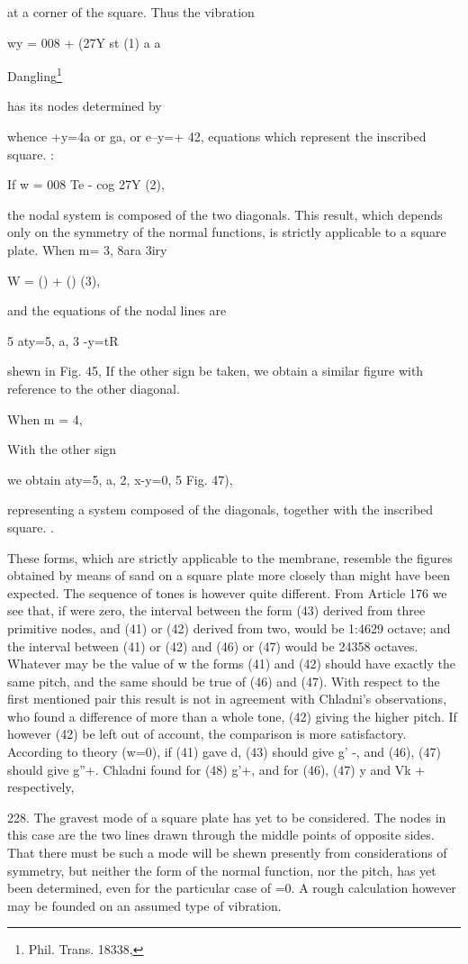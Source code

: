 at a corner of the square. Thus the vibration

wy = 008 + (27Y st (1) a a

Dangling\footnote{ Phil. Trans. 18338,}

has its nodes determined by

whence +y=4a or ga, or e--y=+ 42, equations which represent the
inscribed square. :

If w = 008 Te - cog 27Y (2),

the nodal system is composed of the two diagonals. This result, which
depends only on the symmetry of the normal functions, is strictly
applicable to a square plate. When m= 3, 8ara 3iry

W = () + () (3),

and the equations of the nodal lines are

5 aty=5, a, 3 -y=tR

shewn in Fig. 45, If the other sign be taken, we obtain a similar figure
with reference to the other diagonal.

When m = 4,

With the other sign

we obtain aty=5, a, 2, x-y=0, 5 Fig. 47),

representing a system composed of the diagonals, together with the
inscribed square. .

These forms, which are strictly applicable to the membrane, resemble the
figures obtained by means of sand on a square plate more closely than
might have been expected. The sequence of tones is however quite
different. From Article 176 we see that, if were zero, the interval
between the form (43) derived from three primitive nodes, and (41) or
(42) derived from two, would be 1:4629 octave; and the interval between
(41) or (42) and (46) or (47) would be 24358 octaves. Whatever may be
the value of w the forms (41) and (42) should have exactly the same
pitch, and the same should be true of (46) and (47). With respect to the
first mentioned pair this result is not in agreement with Chladni's
observations, who found a difference of more than a whole tone, (42)
giving the higher pitch. If however (42) be left out of account, the
comparison is more satisfactory. According to theory (w=0), if (41) gave
d, (43) should give g' -, and (46), (47) should give g''+. Chladni found
for (48) g'+, and for (46), (47) y and Vk + respectively,

228. The gravest mode of a square plate has yet to be considered. The
nodes in this case are the two lines drawn through the middle points of
opposite sides. That there must be such a mode will be shewn presently
from considerations of symmetry, but neither the form of the normal
function, nor the pitch, has yet been determined, even for the
particular case of =0. A rough calculation however may be founded on an
assumed type of vibration.

